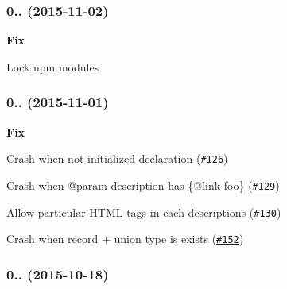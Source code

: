 \subsubsection*{0.. (2015-\/11-\/02)}


\begin{DoxyItemize}
\item {\bfseries Fix}
\begin{DoxyItemize}
\item Lock npm modules
\end{DoxyItemize}
\end{DoxyItemize}

\subsubsection*{0.. (2015-\/11-\/01)}


\begin{DoxyItemize}
\item {\bfseries Fix}
\begin{DoxyItemize}
\item Crash when not initialized declaration (\href{https://github.com/esdoc/esdoc/issues/126}{\tt \#126})
\item Crash when {\ttfamily @param} description has {\ttfamily \{@link foo\}} (\href{https://github.com/esdoc/esdoc/issues/129}{\tt \#129})
\item Allow particular H\+T\+ML tags in each descriptions (\href{https://github.com/esdoc/esdoc/issues/130}{\tt \#130})
\item Crash when record + union type is exists (\href{https://github.com/esdoc/esdoc/issues/152}{\tt \#152})
\end{DoxyItemize}
\end{DoxyItemize}

\subsubsection*{0.. (2015-\/10-\/18)}


